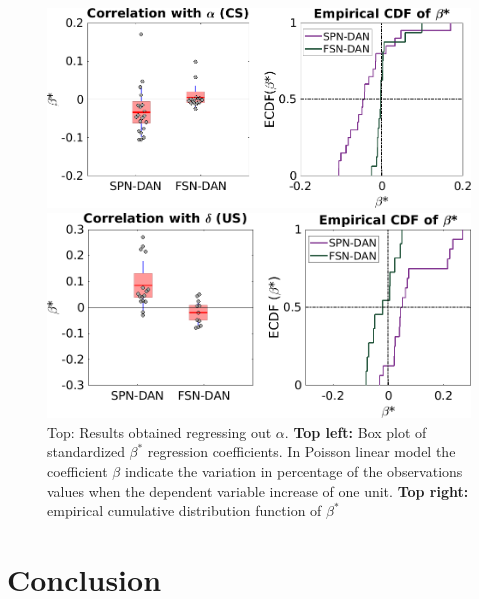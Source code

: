 \begin{figure}[!h]
    \centering
    \includegraphics[scale=0.6]{figures/alphaRegrNew.png}
    
    \vspace{1cm}
    \includegraphics[scale=0.6]{figures/deltaRegr.png}
    \caption{Top: Results obtained regressing out $\alpha$. \textbf{Top left:} Box plot of standardized $\beta^*$ regression coefficients. In Poisson linear model the coefficient $\beta$ indicate the variation in percentage of the observations values when the dependent variable increase of one unit. \textbf{Top right:} empirical cumulative distribution function of $\beta^*$}
    \label{fig:AlphaDeltaReg}
\end{figure}
    
    
\section{Conclusion}




